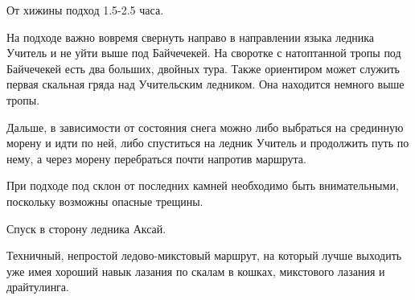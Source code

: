 От хижины \geoLighthouse{} подход 1.5-2.5 часа.


На подходе важно вовремя свернуть направо в направлении языка ледника Учитель и не уйти выше под Байчечекей. На своротке с натоптанной тропы
под Байчечекей есть два больших, двойных тура. Также ориентиром может служить первая скальная гряда над Учительским ледником. Она находится
немного выше тропы.

Дальше, в зависимости от состояния снега можно либо выбраться на срединную морену и идти по ней, либо спуститься на ледник Учитель и
продолжить путь по нему, а через морену перебраться почти напротив маршрута.

При подходе под склон от последних камней необходимо быть внимательными, поскольку возможны опасные трещины.



Спуск в сторону ледника Аксай.

Техничный, непростой ледово-микстовый маршрут, на который лучше выходить уже имея хороший навык лазания по скалам в кошках, микстового
лазания и драйтулинга.
